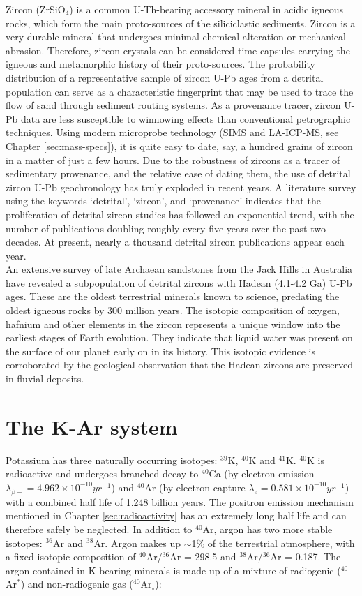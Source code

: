 \documentclass{book}
\begin{document}
Zircon (ZrSiO$_4$) is a common U-Th-bearing accessory mineral in
acidic igneous rocks, which form the main proto-sources of the
siliciclastic sediments. Zircon is a very durable mineral that
undergoes minimal chemical alteration or mechanical
abrasion. Therefore, zircon crystals can be considered time capsules
carrying the igneous and metamorphic history of their
proto-sources. The probability distribution of a representative sample
of zircon U-Pb ages from a detrital population can serve as a
characteristic fingerprint that may be used to trace the flow of sand
through sediment routing systems. As a provenance tracer, zircon U-Pb
data are less susceptible to winnowing effects than conventional
petrographic techniques. Using modern microprobe technology (SIMS and
LA-ICP-MS, see Chapter \ref{sec:mass-specs}), it is quite easy to
date, say, a hundred grains of zircon in a matter of just a few
hours. Due to the robustness of zircons as a tracer of sedimentary
provenance, and the relative ease of dating them, the use of detrital
zircon U-Pb geochronology has truly exploded in recent years. A
literature survey using the keywords `detrital', `zircon', and
`provenance' indicates that the proliferation of detrital zircon
studies has followed an exponential trend, with the number of
publications doubling roughly every five years over the past two
decades. At present, nearly a thousand detrital zircon publications
appear each year.\\

An extensive survey of late Archaean sandstones from the Jack Hills in
Australia have revealed a subpopulation of detrital zircons with
Hadean (4.1-4.2 Ga) U-Pb ages. These are the oldest terrestrial
minerals known to science, predating the oldest igneous rocks by 300
million years.  The isotopic composition of oxygen, hafnium and other
elements in the zircon represents a unique window into the earliest
stages of Earth evolution.  They indicate that liquid water was
present on the surface of our planet early on in its history. This
isotopic evidence is corroborated by the geological observation that
the Hadean zircons are preserved in fluvial deposits.

\chapter{The K-Ar system}
\label{sec:K-Ar}

Potassium has three naturally occurring isotopes: $^{39}$K, $^{40}$K
and $^{41}$K. $^{40}$K is radioactive and undergoes branched decay to
$^{40}$Ca (by electron emission $\lambda_{\beta-} = 4.962 \times
10^{-10} yr^{-1}$) and $^{40}$Ar (by electron capture $\lambda_{e} =
0.581 \times 10^{-10} yr^{-1}$) with a combined half life of 1.248
billion years. The positron emission mechanism mentioned in Chapter
\ref{sec:radioactivity} has an extremely long half life and can
therefore safely be neglected. In addition to $^{40}$Ar, argon has two
more stable isotopes: $^{36}$Ar and $^{38}$Ar. Argon makes up
$\sim$1\% of the terrestrial atmosphere, with a fixed isotopic
composition of $^{40}$Ar/$^{36}$Ar = 298.5 and $^{38}$Ar/$^{36}$Ar =
0.187. The argon contained in K-bearing minerals is made up of a
mixture of radiogenic ($^{40}$Ar$^*$) and non-radiogenic gas
($^{40}$Ar$_\circ$):
\end{document}
